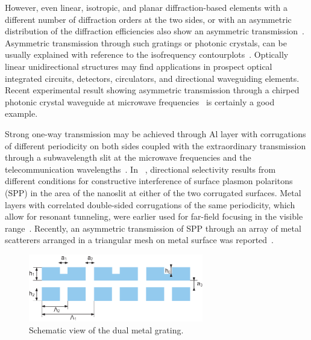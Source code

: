 \documentclass[10pt,letterpaper,twocolumn]{article} %
\begin{document}
However, even linear, isotropic, and planar diffraction-based elements with a different number of diffraction orders at the two sides, or with an asymmetric distribution of the diffraction efficiencies also show an asymmetric transmission~\cite{2,3}. Asymmetric transmission through such gratings or photonic crystals, can be usually explained with reference to the isofrequency contourplots~\cite{4}. Optically linear unidirectional structures may find applications in  prospect optical integrated circuits, detectors, circulators, and directional waveguiding elements.  Recent experimental result showing asymmetric transmission  through a  chirped photonic crystal waveguide at microwave frequencies~\cite{5} is certainly a good example.


Strong one-way transmission may be achieved through Al layer with corrugations of different periodicity on both sides coupled with the extraordinary transmission through a subwavelength slit at the microwave frequencies and the telecommunication wavelengths~\cite{6,7,8}. 
In ~\cite{8},  directional selectivity results from different conditions for constructive interference of surface plasmon polaritons (SPP) in the area of the nanoslit  at either of the two corrugated surfaces. Metal layers with correlated double-sided corrugations of the same periodicity, which allow for resonant tunneling, were earlier used for far-field focusing in the visible range~\cite{9,10}. 
Recently, an asymmetric transmission of SPP through an array of metal scatterers arranged in a triangular mesh on metal surface was reported~\cite{11}.

\begin{figure}
 \begin{center}
 \includegraphics[width=3in]{fig1.eps}
 \end{center}
\caption{Schematic view of the dual metal grating.\label{fig.schem}}
\end{figure}
\end{document}
